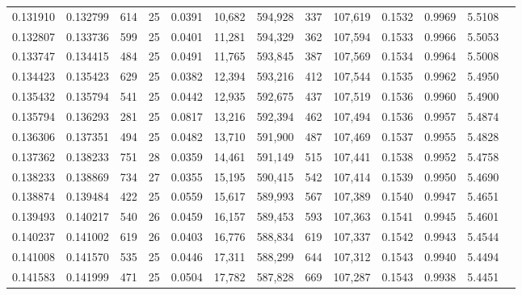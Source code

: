 \begin{tabular}{rrrrrrrrrrrrr}
0.131910 & 0.132799 &   614 &  25 &                                     0.0391 &  10,682 & 594,928 &     337 & 107,619 & 0.1532 & 0.9969 & 5.5108 \\
0.132807 & 0.133736 &   599 &  25 &                                     0.0401 &  11,281 & 594,329 &     362 & 107,594 & 0.1533 & 0.9966 & 5.5053 \\
0.133747 & 0.134415 &   484 &  25 &                                     0.0491 &  11,765 & 593,845 &     387 & 107,569 & 0.1534 & 0.9964 & 5.5008 \\
0.134423 & 0.135423 &   629 &  25 &                                     0.0382 &  12,394 & 593,216 &     412 & 107,544 & 0.1535 & 0.9962 & 5.4950 \\
0.135432 & 0.135794 &   541 &  25 &                                     0.0442 &  12,935 & 592,675 &     437 & 107,519 & 0.1536 & 0.9960 & 5.4900 \\
0.135794 & 0.136293 &   281 &  25 &                                     0.0817 &  13,216 & 592,394 &     462 & 107,494 & 0.1536 & 0.9957 & 5.4874 \\
0.136306 & 0.137351 &   494 &  25 &                                     0.0482 &  13,710 & 591,900 &     487 & 107,469 & 0.1537 & 0.9955 & 5.4828 \\
0.137362 & 0.138233 &   751 &  28 &                                     0.0359 &  14,461 & 591,149 &     515 & 107,441 & 0.1538 & 0.9952 & 5.4758 \\
0.138233 & 0.138869 &   734 &  27 &                                     0.0355 &  15,195 & 590,415 &     542 & 107,414 & 0.1539 & 0.9950 & 5.4690 \\
0.138874 & 0.139484 &   422 &  25 &                                     0.0559 &  15,617 & 589,993 &     567 & 107,389 & 0.1540 & 0.9947 & 5.4651 \\
0.139493 & 0.140217 &   540 &  26 &                                     0.0459 &  16,157 & 589,453 &     593 & 107,363 & 0.1541 & 0.9945 & 5.4601 \\
0.140237 & 0.141002 &   619 &  26 &                                     0.0403 &  16,776 & 588,834 &     619 & 107,337 & 0.1542 & 0.9943 & 5.4544 \\
0.141008 & 0.141570 &   535 &  25 &                                     0.0446 &  17,311 & 588,299 &     644 & 107,312 & 0.1543 & 0.9940 & 5.4494 \\
0.141583 & 0.141999 &   471 &  25 &                                     0.0504 &  17,782 & 587,828 &     669 & 107,287 & 0.1543 & 0.9938 & 5.4451 \\

\end{tabular}
